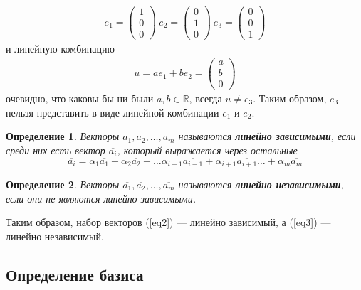 \documentclass[]{article}
\theoremstyle{theorem}
\newtheorem{dfn}{Определение}
\theoremstyle{definition}
\begin{document}
\begin{gather}\label{eq3}
	e_1=
	\begin{pmatrix}
		1
		\\
		0
		\\
		0
	\end{pmatrix}
	\
	e_2=
\begin{pmatrix}
	0
	\\
	1
	\\
	0
\end{pmatrix}
	\
	e_3=
\begin{pmatrix}
	0
	\\
	0
	\\
	1
\end{pmatrix}
\end{gather}
и линейную комбинацию 
\begin{gather*}
	u=ae_1+be_2=\begin{pmatrix}
		a
		\\
		b
		\\
		0
	\end{pmatrix}
\end{gather*}
очевидно, что каковы бы ни были $a,b\in\mathbb{R}$, всегда $u\not=e_3$. Таким образом, $e_3$ нельзя представить в виде линейной комбинации $e_1$ и $e_2$.

\begin{dfn}
	Векторы $\overline{a_1},\overline{a_2},\ldots, \overline{a_m}$ называются \textbf{линейно зависимыми}, если среди них есть вектор $\overline{a_i}$, который выражается через остальные 
	\begin{equation}
		\overline{a_i}=\alpha_1 \overline{a_1}+\alpha_2 \overline{a_2}+\ldots \alpha_{i-1} \overline{a_{i-1}}+\alpha_{i+1} \overline{a_{i+1}}\ldots+\alpha_m \overline{a_m}
	\end{equation}
\end{dfn} 

\begin{dfn}
	Векторы $\overline{a_1},\overline{a_2},\ldots, \overline{a_m}$ называются \textbf{линейно независимыми}, если они не являются линейно зависимыми.
\end{dfn}

Таким образом, набор векторов (\ref{eq2}) --- линейно зависимый, а (\ref{eq3}) --- линейно независимый. 

\subsection{Определение базиса}
\end{document}
